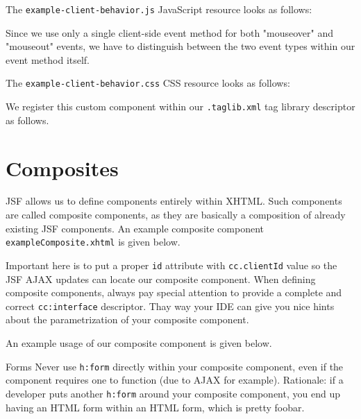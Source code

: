 The \texttt{example-client-behavior.js} JavaScript resource looks as follows:

Since we use only a single client-side event method for both "mouseover" and "mouseout" events, we have to distinguish between the two event types within our event method itself.

The \texttt{example-client-behavior.css} CSS resource looks as follows:


We register this custom component within our \texttt{.taglib.xml} tag library descriptor as follows.


\section{Composites}
JSF allows us to define components entirely within XHTML.
Such components are called composite components, as they are basically a composition of already existing JSF components.
An example composite component \texttt{exampleComposite.xhtml} is given below.

Important here is to put a proper \texttt{id} attribute with \texttt{cc.clientId} value so the JSF AJAX updates can locate our composite component.
When defining composite components, always pay special attention to provide a complete and correct \texttt{cc:interface} descriptor.
Thay way your IDE can give you nice hints about the parametrization of your composite component.

An example usage of our composite component is given below.

\begin{TIP}{Forms}
Never use \texttt{h:form} directly within your composite component, even if the component requires one to function (due to AJAX for example).
Rationale: if a developer puts another \texttt{h:form} around your composite component, you end up having an HTML form within an HTML form, which is pretty foobar.
\end{TIP}


